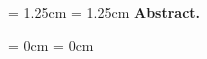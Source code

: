 \thispagestyle{plain}

\begin{center}
  \huge
  \textbf{\@title}
  \vspace{0.2cm}

  \normalsize
  \@author\\
  \@date
  \vspace{.5em}
\end{center}

\leftskip  = 1.25cm
\rightskip = 1.25cm
\noindent
\textbf{Abstract.}

\leftskip  = 0cm
\rightskip = 0cm
